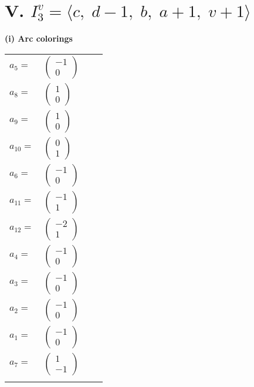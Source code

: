 \documentclass[1p]{elsarticle_modified}
\theoremstyle{definition}
\begin{document}
\centering \section*{V. $I^v_{3}= \langle c,\;d-1,\;b,\;a+1,\;v+1 \rangle$}
\flushleft \textbf{(i) Arc colorings}\\
\begin{tabular}{m{7pt} m{180pt} m{7pt} m{180pt} }
\flushright $a_{5}=$&$\begin{pmatrix}-1\\0\end{pmatrix}$ \\
\flushright $a_{8}=$&$\begin{pmatrix}1\\0\end{pmatrix}$ \\
\flushright $a_{9}=$&$\begin{pmatrix}1\\0\end{pmatrix}$ \\
\flushright $a_{10}=$&$\begin{pmatrix}0\\1\end{pmatrix}$ \\
\flushright $a_{6}=$&$\begin{pmatrix}-1\\0\end{pmatrix}$ \\
\flushright $a_{11}=$&$\begin{pmatrix}-1\\1\end{pmatrix}$ \\
\flushright $a_{12}=$&$\begin{pmatrix}-2\\1\end{pmatrix}$ \\
\flushright $a_{4}=$&$\begin{pmatrix}-1\\0\end{pmatrix}$ \\
\flushright $a_{3}=$&$\begin{pmatrix}-1\\0\end{pmatrix}$ \\
\flushright $a_{2}=$&$\begin{pmatrix}-1\\0\end{pmatrix}$ \\
\flushright $a_{1}=$&$\begin{pmatrix}-1\\0\end{pmatrix}$ \\
\flushright $a_{7}=$&$\begin{pmatrix}1\\-1\end{pmatrix}$\\&\end{tabular}
\end{document}
